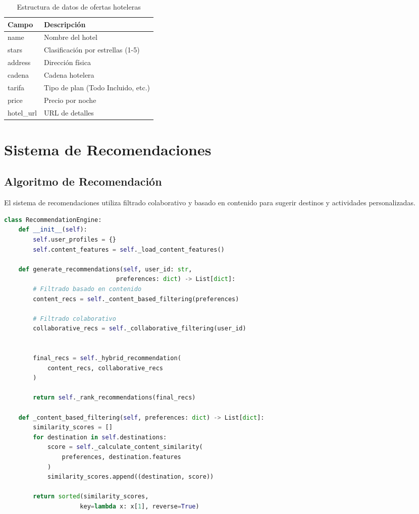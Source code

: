 \documentclass[runningheads]{llncs}
\begin{document}
\begin{table}[H]
\centering
\begin{tabular}{ll}
\toprule
\textbf{Campo} & \textbf{Descripción} \\
\midrule
name & Nombre del hotel \\
stars & Clasificación por estrellas (1-5) \\
address & Dirección física \\
cadena & Cadena hotelera \\
tarifa & Tipo de plan (Todo Incluido, etc.) \\
price & Precio por noche \\
hotel\_url & URL de detalles \\
\bottomrule
\end{tabular}
\caption{Estructura de datos de ofertas hoteleras}
\end{table}

\section{Sistema de Recomendaciones}

\subsection{Algoritmo de Recomendación}

El sistema de recomendaciones utiliza filtrado colaborativo y basado en contenido para sugerir destinos y actividades personalizadas.

\begin{lstlisting}[language=Python, caption=Motor de recomendaciones]
class RecommendationEngine:
    def __init__(self):
        self.user_profiles = {}
        self.content_features = self._load_content_features()
        
    def generate_recommendations(self, user_id: str, 
                               preferences: dict) -> List[dict]:
        # Filtrado basado en contenido
        content_recs = self._content_based_filtering(preferences)
        
        # Filtrado colaborativo
        collaborative_recs = self._collaborative_filtering(user_id)
        
      
        final_recs = self._hybrid_recommendation(
            content_recs, collaborative_recs
        )
        
        return self._rank_recommendations(final_recs)
        
    def _content_based_filtering(self, preferences: dict) -> List[dict]:
        similarity_scores = []
        for destination in self.destinations:
            score = self._calculate_content_similarity(
                preferences, destination.features
            )
            similarity_scores.append((destination, score))
        
        return sorted(similarity_scores, 
                     key=lambda x: x[1], reverse=True)
\end{lstlisting}
\end{document}
